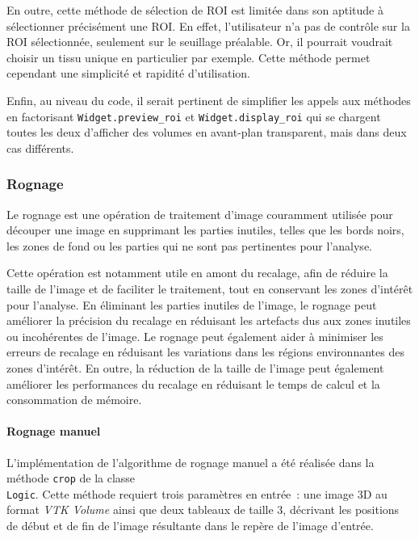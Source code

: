 \documentclass{article}
\newcommand{\subsubsubsection}[1]{\paragraph{#1}\par\noindent\bigskip}
\begin{document}
{{{{                \bigskip

                En outre, cette méthode de sélection de ROI est limitée dans son aptitude à sélectionner précisément une ROI. En effet, l'utilisateur n'a pas de contrôle sur la ROI sélectionnée, seulement sur le seuillage préalable. Or, il pourrait voudrait choisir un tissu unique en particulier par exemple. Cette méthode permet cependant une simplicité et rapidité d'utilisation.

                \bigskip

                Enfin, au niveau du code, il serait pertinent de simplifier les appels aux méthodes en factorisant \texttt{Widget.preview\_roi} et \texttt{Widget.display\_roi} qui se chargent toutes les deux d'afficher des volumes en avant-plan transparent, mais dans deux cas différents.
            }
        }

        {
            \subsubsection{Rognage}
            \label{subsubsec:cropping-preprocessing-implementation}

            {
                Le rognage est une opération de traitement d'image couramment utilisée pour découper une image en supprimant les parties inutiles, telles que les bords noirs, les zones de fond ou les parties qui ne sont pas pertinentes pour l'analyse.

                Cette opération est notamment utile en amont du recalage, afin de réduire la taille de l'image et de faciliter le traitement, tout en conservant les zones d'intérêt pour l'analyse. En éliminant les parties inutiles de l'image, le rognage peut améliorer la précision du recalage en réduisant les artefacts dus aux zones inutiles ou incohérentes de l'image. Le rognage peut également aider à minimiser les erreurs de recalage en réduisant les variations dans les régions environnantes des zones d'intérêt. En outre, la réduction de la taille de l'image peut également améliorer les performances du recalage en réduisant le temps de calcul et la consommation de mémoire.
            }

            {
                \bigskip
                \subsubsubsection{Rognage manuel}

                L'implémentation de l'algorithme de rognage manuel a été réalisée dans la méthode \texttt{crop} de la classe
                \\ \texttt{Logic}.
                Cette méthode requiert trois paramètres en entrée~: une image 3D au format \textit{VTK Volume} ainsi que deux tableaux de taille 3, décrivant les positions de début et de fin de l'image résultante dans le repère de l'image d'entrée.

}}}}
\end{document}
